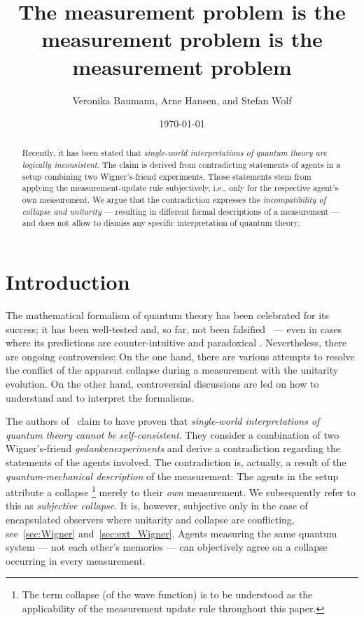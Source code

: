\documentclass[aps,pra,twocolumn]{revtex4-1}
\theoremstyle{definition}
\theoremstyle{remark}
\begin{document}
\title{The measurement problem is the measurement problem is the measurement problem} 
\author{Veronika Baumann, Arne Hansen, and Stefan Wolf}

\date{\today}

\begin{abstract}
\noindent
Recently, it has been stated that {\em single-world interpretations of quantum theory are logically inconsistent\/}. 
The claim is derived from contradicting statements of agents in a setup combining two Wigner's-friend experiments.
Those statements stem from applying the measurement-update rule subjectively, i.e., only for the respective agent's own measurement.
We argue that the contradiction expresses the {\em incompatibility of collapse and unitarity\/} --- resulting in different formal descriptions of a measurement --- and does not allow to dismiss any specific interpretation of quantum theory. 
\end{abstract}

\maketitle

\section{Introduction}
\noindent

The mathematical formalism of quantum theory has been celebrated for its success; it has been well-tested and, so far, not been falsified~\cite{Popper1934} --- even in cases where its predictions are counter-intuitive and paradoxical \cite{aspect1982experimental,bouwmeester1997experimental,stefanov2002quantum,ma2012experimental,denkmayr2014observation}. 
Nevertheless, there are ongoing controversies: On the one hand, there are various attempts to resolve the conflict of the apparent collapse during a measurement with the unitarity evolution. 
On the other hand, controversial discussions are led on how to understand and to interpret the formalisms. 

The authors of~\cite{FrRen} claim to have proven that \emph{single-world interpretations of quantum theory cannot be self-consistent}. 
They consider a combination of two Wigner's-friend \emph{gedankenexperiments} and derive a contradiction regarding the statements of the agents involved. 
The contradiction is, actually, a result of the \emph{quantum-mechanical description} of the measurement:
The agents in the setup attribute a collapse \footnote{The term collapse (of the wave function) is to be understood as the applicability of the measurement update rule throughout this paper.} merely to their \emph{own} measurement. 
We subsequently refer to this as \emph{subjective collapse}. 
It is, however, subjective only in the case of encapsulated observers where unitarity and collapse are conflicting, see~\ref{sec:Wigner} and~\ref{sec:ext_Wigner}. 
Agents measuring the same quantum system --- not each other's memories --- can objectively agree on a collapse occurring in every measurement.
\end{document}
